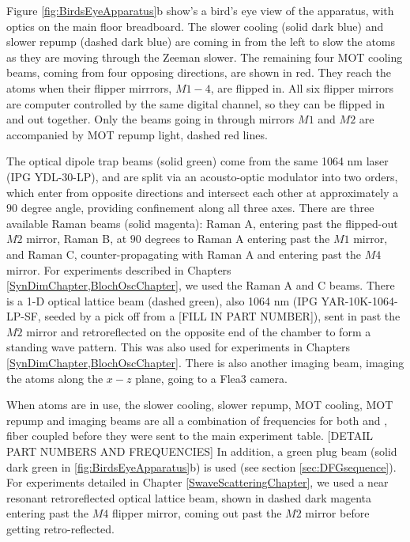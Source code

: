 Figure \ref{fig:BirdsEyeApparatus}b show's a bird's eye view of the apparatus, with optics on the main floor breadboard. The slower cooling (solid dark blue) and slower repump (dashed dark blue) are coming in from the left to slow the atoms as they are moving through the Zeeman slower. The remaining four MOT cooling beams, coming from four opposing directions, are shown in red.  They reach the atoms when their flipper mirrrors, $M1-4$, are flipped in. All six flipper mirrors are computer controlled by the same digital channel, so they can be flipped in and out together. Only the beams going in through mirrors $M1$ and $M2$ are accompanied by MOT repump light, dashed red lines. 

The optical dipole trap beams (solid green) come from the same 1064 nm laser (IPG YDL-30-LP), and are split via an acousto-optic modulator into two orders, which enter from opposite directions and intersect each other at approximately a $90$ degree angle, providing confinement along all three axes. There are three available Raman beams (solid magenta): Raman A, entering past the flipped-out $M2$ mirror, Raman B, at $90$ degrees to Raman A entering past the $M1$ mirror, and Raman C, counter-propagating with Raman A and entering past the $M4$ mirror. For experiments described in Chapters \ref{SynDimChapter,BlochOscChapter}, we used the Raman A and C beams. There is a 1-D optical lattice beam (dashed green), also 1064 nm (IPG YAR-10K-1064-LP-SF, seeded by a pick off from a [FILL IN PART NUMBER]), sent in past the $M2$ mirror and retroreflected on the opposite end of the chamber to form a standing wave pattern. This was also used for experiments in Chapters \ref{SynDimChapter,BlochOscChapter}. There is also another imaging beam, imaging the atoms along the $x-z$ plane, going to a Flea3 camera. 

When \K{} atoms are in use, the slower cooling, slower repump, MOT cooling, MOT repump and imaging beams are all a combination of frequencies for both \Rb{} and \K{}, fiber coupled before they were sent to the main experiment table. [DETAIL PART NUMBERS AND FREQUENCIES] In addition, a green plug beam (solid dark green in \ref{fig:BirdsEyeApparatus}b) is used (see section \ref{sec:DFGsequence}). For \K{} experiments detailed in Chapter \ref{SwaveScatteringChapter}, we used a near resonant retroreflected optical lattice beam, shown in dashed dark magenta entering past the $M4$ flipper mirror, coming out past the $M2$ mirror before getting retro-reflected.

